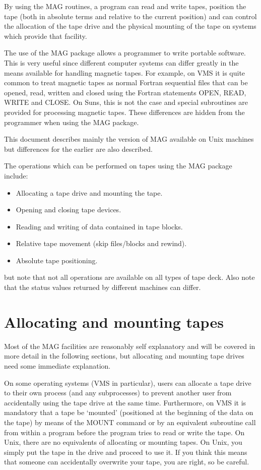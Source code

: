 By using the MAG routines, a program can read and write tapes, position the
tape (both in absolute terms and relative to the current position) and can
control the allocation of the tape drive and the physical mounting of the tape
on systems which provide that facility.

The use of the MAG package allows a programmer to write portable software. This
is very useful since different computer systems can differ greatly in the means
available for handling magnetic tapes. For example, on VMS it is quite common
to treat magnetic tapes as normal Fortran sequential files that can be opened,
read, written and closed using the Fortran statements OPEN, READ, WRITE and
CLOSE. On Suns, this is not the case and special subroutines are provided for
processing magnetic tapes. These differences are hidden from the programmer
when using the MAG package.

This document describes mainly the version of MAG available on Unix machines
but differences for the earlier
are also described.

The operations which can be performed on tapes using the MAG package
include:

\begin{itemize}
\item Allocating a tape drive and mounting the tape.
\item Opening and closing tape devices.
\item Reading and writing of data contained in tape blocks.
\item Relative tape movement (skip files/blocks and rewind).
\item Absolute tape positioning.
\end{itemize}

but note that not all operations are available on all types of tape deck.
Also note that the status values returned by different machines can differ.

\section{Allocating and mounting tapes}
Most of the MAG facilities are reasonably self explanatory and will be covered
in more detail in the following sections, but allocating and mounting tape
drives need some immediate explanation.

On some operating systems (VMS in particular), users can allocate a tape drive
to their own process (and any subprocesses) to prevent another user from
accidentally using the tape drive at the same time. Furthermore, on VMS it is
mandatory that a tape be `mounted' (positioned at the beginning of the data on
the tape) by means of the MOUNT command or by an equivalent subroutine call
from within a program before the program tries to read or write the tape. On
Unix, there are no equivalents of allocating or mounting tapes. On Unix, you
simply put the tape in the drive and proceed to use it. If you think this means
that someone can accidentally overwrite your tape, you are right, so be
careful.

